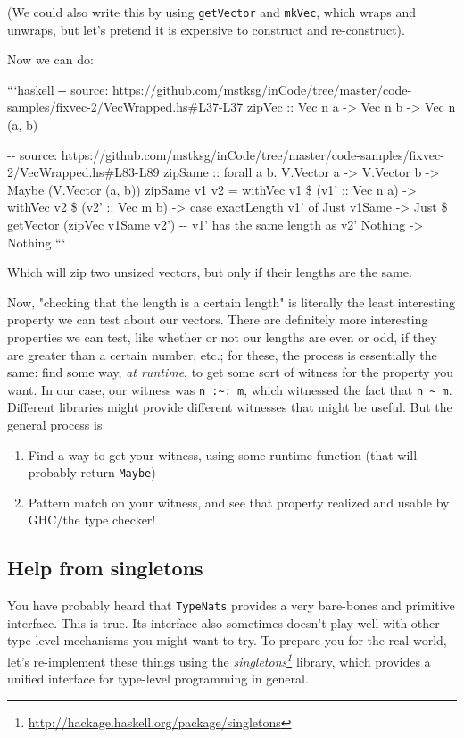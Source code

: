 \documentclass[]{article}
\renewcommand{\href}[2]{#2\footnote{\url{#1}}}
\begin{document}
(We could also write this by using \texttt{getVector} and \texttt{mkVec}, which
wraps and unwraps, but let's pretend it is expensive to construct and
re-construct).

Now we can do:

```haskell -\/- source:
https://github.com/mstksg/inCode/tree/master/code-samples/fixvec-2/VecWrapped.hs\#L37-L37
zipVec :: Vec n a -\textgreater{} Vec n b -\textgreater{} Vec n (a, b)

-\/- source:
https://github.com/mstksg/inCode/tree/master/code-samples/fixvec-2/VecWrapped.hs\#L83-L89
zipSame :: forall a b. V.Vector a -\textgreater{} V.Vector b -\textgreater{}
Maybe (V.Vector (a, b)) zipSame v1 v2 = withVec v1 \$ (v1' :: Vec n a)
-\textgreater{} withVec v2 \$ (v2' :: Vec m b) -\textgreater{} case exactLength
v1' of Just v1Same -\textgreater{} Just \$ getVector (zipVec v1Same v2') -\/-
v1' has the same length as v2' Nothing -\textgreater{} Nothing ```

Which will zip two unsized vectors, but only if their lengths are the same.

Now, "checking that the length is a certain length" is literally the least
interesting property we can test about our vectors. There are definitely more
interesting properties we can test, like whether or not our lengths are even or
odd, if they are greater than a certain number, etc.; for these, the process is
essentially the same: find some way, \emph{at runtime}, to get some sort of
witness for the property you want. In our case, our witness was
\texttt{n\ :\textasciitilde{}:\ m}, which witnessed the fact that
\texttt{n\ \textasciitilde{}\ m}. Different libraries might provide different
witnesses that might be useful. But the general process is

\begin{enumerate}
\tightlist
\item
  Find a way to get your witness, using some runtime function (that will
  probably return \texttt{Maybe})
\item
  Pattern match on your witness, and see that property realized and usable by
  GHC/the type checker!
\end{enumerate}

\subsection{Help from singletons}

You have probably heard that \texttt{TypeNats} provides a very bare-bones and
primitive interface. This is true. Its interface also sometimes doesn't play
well with other type-level mechanisms you might want to try. To prepare you for
the real world, let's re-implement these things using the
\emph{\href{http://hackage.haskell.org/package/singletons}{singletons}} library,
which provides a unified interface for type-level programming in general.
\end{document}
